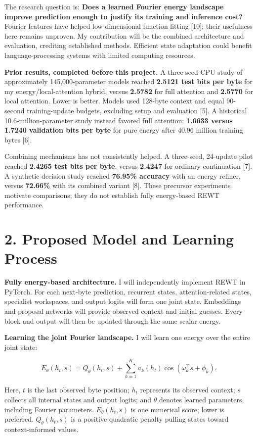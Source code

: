 \documentclass[11pt,letterpaper]{article}
\begin{document}
The research question is: \textbf{Does a learned Fourier energy landscape improve prediction enough to justify its training and inference cost?} Fourier features have helped low-dimensional function fitting [10]; their usefulness here remains unproven. My contribution will be the combined architecture and evaluation, crediting established methods. Efficient state adaptation could benefit language-processing systems with limited computing resources.

\textbf{Prior results, completed before this project.} A three-seed CPU study of approximately 145,000-parameter models reached \textbf{2.5121 test bits per byte} for my energy/local-attention hybrid, versus \textbf{2.5782} for full attention and \textbf{2.5770} for local attention. Lower is better. Models used 128-byte context and equal 90-second training-update budgets, excluding setup and evaluation [5]. A historical 10.6-million-parameter study instead favored full attention: \textbf{1.6633 versus 1.7240 validation bits per byte} for pure energy after 40.96 million training bytes [6].

Combining mechanisms has not consistently helped. A three-seed, 24-update pilot reached \textbf{2.4265 test bits per byte}, versus \textbf{2.4247} for ordinary continuation [7]. A synthetic decision study reached \textbf{76.95\% accuracy} with an energy refiner, versus \textbf{72.66\%} with its combined variant [8]. These precursor experiments motivate comparisons; they do not establish fully energy-based REWT performance.

\newpage
\section*{2. Proposed Model and Learning Process}

\textbf{Fully energy-based architecture.} I will independently implement REWT in PyTorch. For each next-byte prediction, recurrent states, attention-related states, specialist workspaces, and output logits will form one joint state. Embeddings and proposal networks will provide observed context and initial guesses. Every block and output will then be updated through the same scalar energy.

\textbf{Learning the joint Fourier landscape.} I will learn one energy over the entire joint state:

\[
E_\theta(h_t,s)=Q_\theta(h_t,s)+\sum_{k=1}^{K}a_k(h_t)\cos(\omega_k^\top s+\phi_k).
\]

Here, \(t\) is the last observed byte position; \(h_t\) represents its observed context; \(s\) collects all internal states and output logits; and \(\theta\) denotes learned parameters, including Fourier parameters. \(E_\theta(h_t,s)\) is one numerical score; lower is preferred. \(Q_\theta(h_t,s)\) is a positive quadratic penalty pulling states toward context-informed values.
\end{document}
